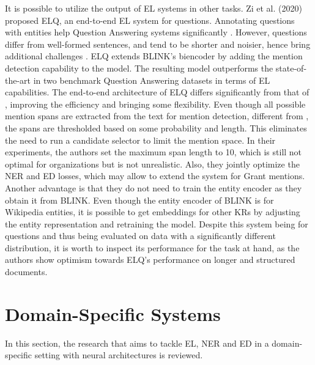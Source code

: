 \documentclass{report}
\theoremstyle{definition}
\theoremstyle{remark}
\begin{document}
It is possible to utilize the output of EL systems in other tasks. Zi et al. (2020) \cite{elq} proposed ELQ, an end-to-end EL system for questions. Annotating questions with entities help Question Answering systems significantly \cite{elq}. However, questions differ from well-formed sentences, and tend to be shorter and noisier, hence bring additional challenges \cite{elq}. ELQ extends BLINK's biencoder by adding the mention detection capability to the model. The resulting model outperforms the state-of-the-art in two benchmark Question Answering datasets in terms of EL capabilities. The end-to-end architecture of ELQ differs significantly from that of \cite{kolitsas}, improving the efficiency and bringing some flexibility. Even though all possible mention spans are extracted from the text for mention detection, different from \cite{kolitsas}, the spans are thresholded based on some probability and length. This eliminates the need to run a candidate selector to limit the mention space. In their experiments, the authors set the maximum span length to 10, which is still not optimal for organizations but is not unrealistic. Also, they jointly optimize the NER and ED losses, which may allow to extend the system for Grant mentions. Another advantage is that they do not need to train the entity encoder as they obtain it from BLINK. Even though the entity encoder of BLINK is for Wikipedia entities, it is possible to get embeddings for other KRs by adjusting the entity representation and retraining the model. Despite this system being for questions and thus being evaluated on data with a significantly different distribution, it is worth to inspect its performance for the task at hand, as the authors show optimism towards ELQ's performance on longer and structured documents.

\section{Domain-Specific Systems}
\label{domSpec}
In this section, the research that aims to tackle EL, NER and ED in a domain-specific setting with neural architectures is reviewed.
\end{document}
